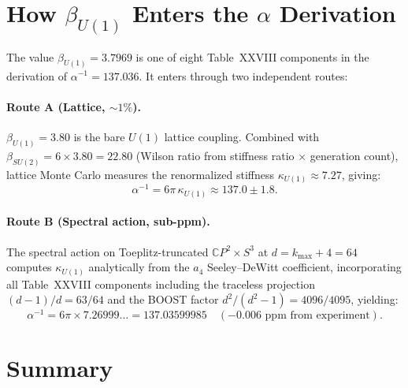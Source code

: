 \documentclass[12pt,a4paper]{article}
\begin{document}
\section{How $\beta_{U(1)}$ Enters the $\alpha$ Derivation}
\label{sec:chain}

The value $\beta_{U(1)} = 3.7969$ is one of eight Table~XXVIII components
in the derivation of $\alpha^{-1} = 137.036$.  It enters through two
independent routes:

\paragraph{Route A (Lattice, $\sim 1\%$).}
$\beta_{U(1)} = 3.80$ is the bare $U(1)$ lattice coupling.  Combined with
$\beta_{SU(2)} = 6 \times 3.80 = 22.80$ (Wilson ratio from stiffness ratio
$\times$ generation count), lattice Monte Carlo measures the renormalized
stiffness $\kappa_{U(1)} \approx 7.27$, giving:
\begin{equation}
\alpha^{-1} = 6\pi\,\kappa_{U(1)} \approx 137.0 \pm 1.8.
\end{equation}

\paragraph{Route B (Spectral action, sub-ppm).}
The spectral action on Toeplitz-truncated $\mathbb{C}P^2 \times S^3$ at
$d = k_{\max} + 4 = 64$ computes $\kappa_{U(1)}$ analytically from the
$a_4$ Seeley--DeWitt coefficient, incorporating all Table~XXVIII components
including the traceless projection $(d{-}1)/d = 63/64$ and the BOOST factor
$d^2/(d^2{-}1) = 4096/4095$, yielding:
\begin{equation}
\alpha^{-1} = 6\pi \times 7.26999\ldots = 137.03599985
\quad (-0.006\text{ ppm from experiment}).
\end{equation}

\section{Summary}
\label{sec:summary}
\end{document}
